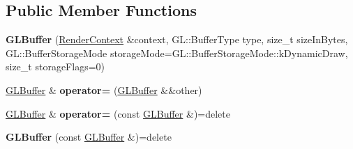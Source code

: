 \subsection*{Public Member Functions}
\begin{DoxyCompactItemize}
\item 
\mbox{\label{classrev_1_1_g_l_buffer_a8cb2953194f65b93018d4c3d6565d876}} 
{\bfseries G\+L\+Buffer} (\mbox{\hyperlink{classrev_1_1_render_context}{Render\+Context}} \&context, G\+L\+::\+Buffer\+Type type, size\+\_\+t size\+In\+Bytes, G\+L\+::\+Buffer\+Storage\+Mode storage\+Mode=G\+L\+::\+Buffer\+Storage\+Mode\+::k\+Dynamic\+Draw, size\+\_\+t storage\+Flags=0)
\item 
\mbox{\label{classrev_1_1_g_l_buffer_a6c2bcb730e01ecbde4a9466b2f92f4ff}} 
\mbox{\hyperlink{classrev_1_1_g_l_buffer}{G\+L\+Buffer}} \& {\bfseries operator=} (\mbox{\hyperlink{classrev_1_1_g_l_buffer}{G\+L\+Buffer}} \&\&other)
\item 
\mbox{\label{classrev_1_1_g_l_buffer_a3bc77bb3daba0003133a7b49133d268c}} 
\mbox{\hyperlink{classrev_1_1_g_l_buffer}{G\+L\+Buffer}} \& {\bfseries operator=} (const \mbox{\hyperlink{classrev_1_1_g_l_buffer}{G\+L\+Buffer}} \&)=delete
\item 
\mbox{\label{classrev_1_1_g_l_buffer_a032fdc2003f4f4034ff8e4e967578031}} 
{\bfseries G\+L\+Buffer} (const \mbox{\hyperlink{classrev_1_1_g_l_buffer}{G\+L\+Buffer}} \&)=delete
\end{DoxyCompactItemize}

